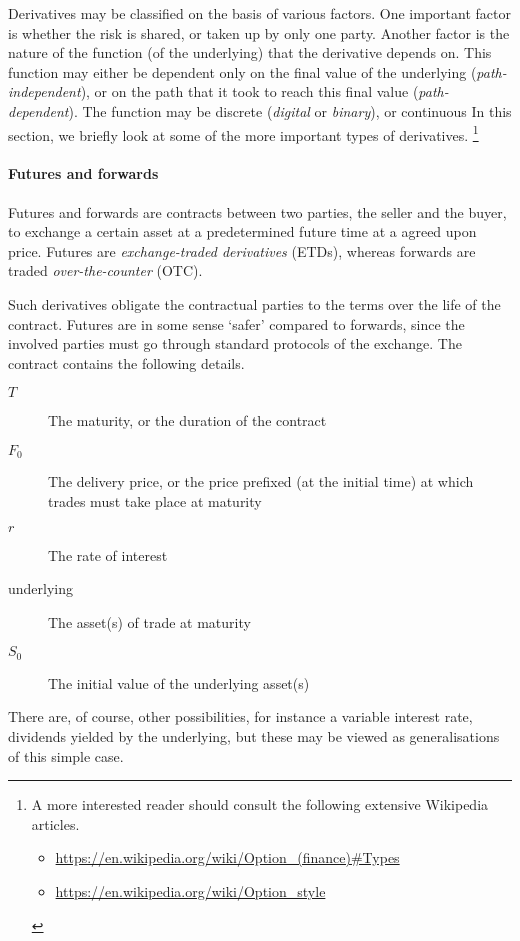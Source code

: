 Derivatives may be classified on the basis of various factors. One important factor is whether the risk is shared, or taken up by only one party. Another factor is the nature of the function (of the underlying) that the derivative depends on. This function may either be dependent only on the final value of the underlying (\emph{path-independent}), or on the path that it took to reach this final value (\emph{path-dependent}). The function may be discrete (\emph{digital} or \emph{binary}), or continuous In this section, we briefly look at some of the more important types of derivatives. \footnote{
	A more interested reader should consult the following extensive Wikipedia articles.
	\begin{itemize}
		\item \url{https://en.wikipedia.org/wiki/Option_(finance)\#Types}
		\item \url{https://en.wikipedia.org/wiki/Option_style}
	\end{itemize}
}


\paragraph{Futures and forwards}

\begin{dfn}
	Futures and forwards are contracts between two parties, the seller and the buyer, to exchange a certain asset at a predetermined future time at a agreed upon price. Futures are \emph{exchange-traded derivatives} (ETDs), whereas forwards are traded \emph{over-the-counter} (OTC).
\end{dfn}

Such derivatives obligate the contractual parties to the terms over the life of the contract. Futures are in some sense `safer' compared to forwards, since the involved parties must go through standard protocols of the exchange.
The contract contains the following details.
\begin{description}
	\item[$ T $] The maturity, or the duration of the contract
	\item[$ F_0 $] The delivery price, or the price prefixed (at the initial time) at which trades must take place at maturity
	\item[$ r $] The rate of interest
	\item[underlying] The asset(s) of trade at maturity
	\item[$ S_0 $] The initial value of the underlying asset(s)
\end{description}
There are, of course, other possibilities, for instance a variable interest rate, dividends yielded by the underlying, but these may be viewed as generalisations of this simple case.

